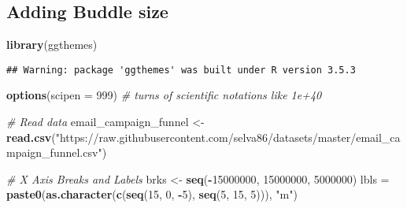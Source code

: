 \documentclass[]{article}
\newenvironment{Shaded}{\begin{snugshade}}{\end{snugshade}}
\newcommand{\KeywordTok}[1]{\textcolor[rgb]{0.13,0.29,0.53}{\textbf{#1}}}
\newcommand{\DataTypeTok}[1]{\textcolor[rgb]{0.13,0.29,0.53}{#1}}
\newcommand{\DecValTok}[1]{\textcolor[rgb]{0.00,0.00,0.81}{#1}}
\newcommand{\StringTok}[1]{\textcolor[rgb]{0.31,0.60,0.02}{#1}}
\newcommand{\CommentTok}[1]{\textcolor[rgb]{0.56,0.35,0.01}{\textit{#1}}}
\newcommand{\OperatorTok}[1]{\textcolor[rgb]{0.81,0.36,0.00}{\textbf{#1}}}
\newcommand{\NormalTok}[1]{#1}
\begin{document}
\subsection{Adding Buddle size}\label{adding-buddle-size-2}

\begin{Shaded}
\begin{Highlighting}[]
\KeywordTok{library}\NormalTok{(ggthemes)}
\end{Highlighting}
\end{Shaded}

\begin{verbatim}
## Warning: package 'ggthemes' was built under R version 3.5.3
\end{verbatim}

\begin{Shaded}
\begin{Highlighting}[]
\KeywordTok{options}\NormalTok{(}\DataTypeTok{scipen =} \DecValTok{999}\NormalTok{)  }\CommentTok{# turns of scientific notations like 1e+40}

\CommentTok{# Read data}
\NormalTok{email_campaign_funnel <-}\StringTok{ }\KeywordTok{read.csv}\NormalTok{(}\StringTok{"https://raw.githubusercontent.com/selva86/datasets/master/email_campaign_funnel.csv"}\NormalTok{)}

\CommentTok{# X Axis Breaks and Labels }
\NormalTok{brks <-}\StringTok{ }\KeywordTok{seq}\NormalTok{(}\OperatorTok{-}\DecValTok{15000000}\NormalTok{, }\DecValTok{15000000}\NormalTok{, }\DecValTok{5000000}\NormalTok{)}
\NormalTok{lbls =}\StringTok{ }\KeywordTok{paste0}\NormalTok{(}\KeywordTok{as.character}\NormalTok{(}\KeywordTok{c}\NormalTok{(}\KeywordTok{seq}\NormalTok{(}\DecValTok{15}\NormalTok{, }\DecValTok{0}\NormalTok{, }\OperatorTok{-}\DecValTok{5}\NormalTok{), }\KeywordTok{seq}\NormalTok{(}\DecValTok{5}\NormalTok{, }\DecValTok{15}\NormalTok{, }\DecValTok{5}\NormalTok{))), }\StringTok{"m"}\NormalTok{)}


\end{Highlighting}
\end{Shaded}
\end{document}
